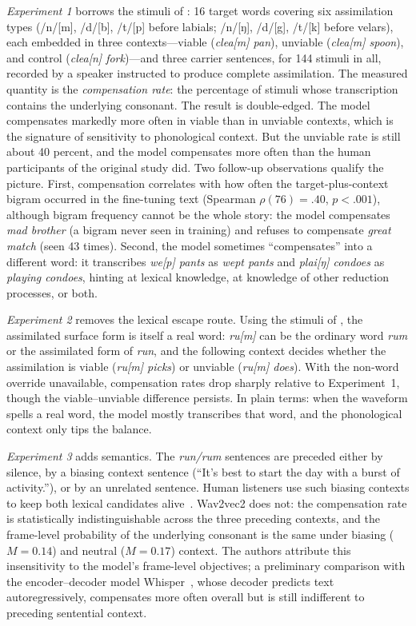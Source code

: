 \documentclass[11pt,a4paper]{article}
\begin{document}
\emph{Experiment 1} borrows the stimuli of \citet{darcy2009}: 16 target
words covering six assimilation types (/n/[m], /d/[b], /t/[p] before
labials; /n/[ŋ], /d/[g], /t/[k] before velars), each embedded in three
contexts---viable (\emph{clea[m] pan}), unviable (\emph{clea[m]
spoon}), and control (\emph{clea[n] fork})---and three carrier
sentences, for 144 stimuli in all, recorded by a speaker instructed to
produce complete assimilation. The measured quantity is the
\emph{compensation rate}: the percentage of stimuli whose transcription
contains the underlying consonant. The result is double-edged. The
model compensates markedly more often in viable than in unviable
contexts, which is the signature of sensitivity to phonological
context. But the unviable rate is still about 40 percent, and the model
compensates more often than the human participants of the original
study did. Two follow-up observations qualify the picture. First,
compensation correlates with how often the target-plus-context bigram
occurred in the fine-tuning text (Spearman $\rho(76)=.40$,
$p<.001$), although bigram frequency cannot be the whole story: the
model compensates \emph{mad brother} (a bigram never seen in training)
and refuses to compensate \emph{great match} (seen 43 times). Second,
the model sometimes ``compensates'' into a different word: it
transcribes \emph{we[p] pants} as \emph{wept pants} and \emph{plai[ŋ]
condoes} as \emph{playing condoes}, hinting at lexical knowledge, at
knowledge of other reduction processes, or both.

\emph{Experiment 2} removes the lexical escape route. Using the
stimuli of \citet{gmw2001}, the assimilated surface form is itself a
real word: \emph{ru[m]} can be the ordinary word \emph{rum} or the
assimilated form of \emph{run}, and the following context decides
whether the assimilation is viable (\emph{ru[m] picks}) or unviable
(\emph{ru[m] does}). With the non-word override unavailable,
compensation rates drop sharply relative to Experiment~1, though the
viable--unviable difference persists. In plain terms: when the waveform
spells a real word, the model mostly transcribes that word, and the
phonological context only tips the balance.

\emph{Experiment 3} adds semantics. The \emph{run/rum} sentences are
preceded either by silence, by a biasing context sentence (``It's best
to start the day with a burst of activity.''), or by an unrelated
sentence. Human listeners use such biasing contexts to keep both
lexical candidates alive~\citep{gmw2001}. Wav2vec2 does not: the
compensation rate is statistically indistinguishable across the three
preceding contexts, and the frame-level probability of the underlying
consonant is the same under biasing ($M=0.14$) and neutral
($M=0.17$) context. The authors attribute this insensitivity to the
model's frame-level objectives; a preliminary comparison with the
encoder--decoder model Whisper~\citep{radford2023}, whose decoder
predicts text autoregressively, compensates more often overall but is
still indifferent to preceding sentential context.
\end{document}
